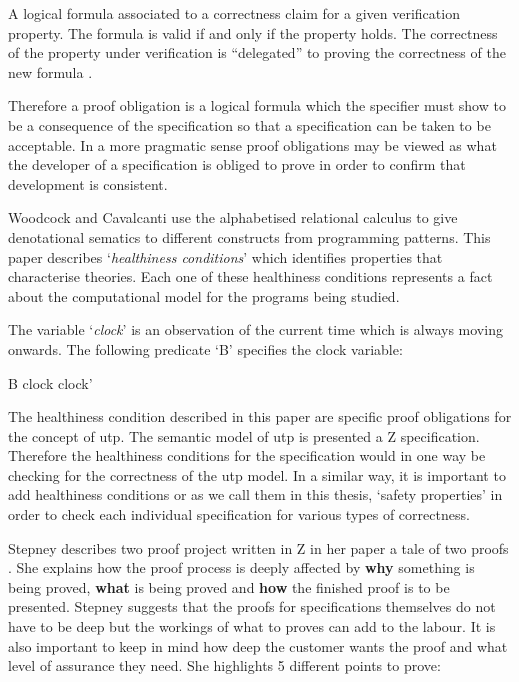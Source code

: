 \begin{defin}
A logical formula associated to a correctness claim for a given verification property. The formula is valid if and only if the property holds. The correctness of the property under verification is “delegated” to proving the correctness of the new formula \cite{handbookofembed}.
\end{defin}

Therefore a proof obligation is a logical formula which the specifier must show to be a consequence of the specification so that a specification can be taken to be acceptable. In a more pragmatic sense proof obligations may be viewed as what the developer of a specification is obliged to prove in order to confirm that development is consistent.

Woodcock and Cavalcanti \cite{woodcock2004tutorial} use the alphabetised relational calculus to give denotational sematics to different constructs from programming patterns. This paper describes `\emph{healthiness conditions}' which identifies properties that characterise theories. Each one of these healthiness conditions represents a fact about the computational model for the programs being studied.

\begin{exam}
The variable `\emph{clock}' is an observation of the current time which is always moving onwards. The following predicate `B' specifies the clock variable:

\begin{zed}
B  clock \leq clock'
\end{zed}
\end{exam}

The healthiness condition described in this paper are specific proof obligations for the concept of \gls{utp}. The semantic model of \gls{utp} is presented a Z specification. Therefore the healthiness conditions for the specification would in one way be checking for the correctness of the \gls{utp} model. In a similar way, it is important to add healthiness conditions or as we call them in this thesis, `safety properties' in order to check each individual specification for various types of correctness.

Stepney describes two proof project written in Z in her paper a tale of two proofs \cite{stepney1998tale}. She explains how the proof process is deeply affected by \textbf{why} something is being proved, \textbf{what} is being proved and \textbf{how} the finished proof is to be presented. Stepney suggests that the proofs for specifications themselves do not have to be deep but the workings of what to proves can add to the labour. It is also important to keep in mind how deep the customer wants the proof and what level of assurance they need. She highlights 5 different points to prove:

